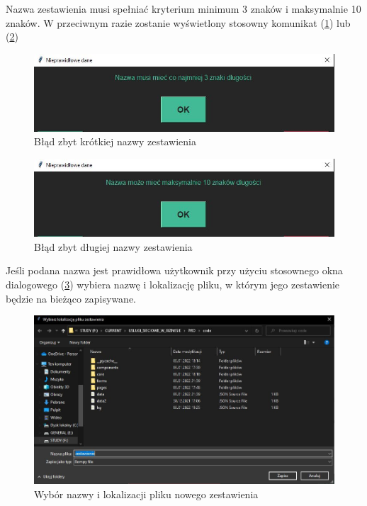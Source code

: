 \documentclass[12pt,twoside]{article}
\begin{document}
Nazwa zestawienia musi spełniać kryterium minimum 3 znaków i maksymalnie 10 znaków. W przeciwnym razie zostanie wyświetlony stosowny komunikat (\ref{fig:app:name_too_short_err}) lub (\ref{fig:app:name_too_long_err})

\begin{figure}[h]
	\centering
	\includegraphics[width=\textwidth]{figures/app/name_too_short_err.jpg}
	\caption{Błąd zbyt krótkiej nazwy zestawienia}
\label{fig:app:name_too_short_err}
\end{figure}

\begin{figure}[H]
	\centering
	\includegraphics[width=\textwidth]{figures/app/name_too_long_err.jpg}
	\caption{Błąd zbyt długiej nazwy zestawienia}
\label{fig:app:name_too_long_err}
\end{figure}

Jeśli podana nazwa jest prawidłowa użytkownik przy użyciu stosownego okna dialogowego (\ref{fig:app:save_file}) wybiera nazwę i lokalizację pliku, w którym jego zestawienie będzie na bieżąco zapisywane.

\begin{figure}[H]
	\centering
	\includegraphics[width=\textwidth]{figures/app/save_file.jpg}
	\caption{Wybór nazwy i lokalizacji pliku nowego zestawienia}
\label{fig:app:save_file}
\end{figure}
\end{document}
